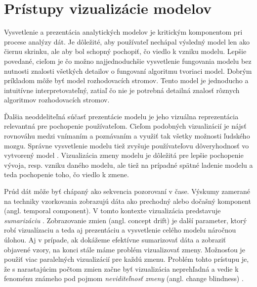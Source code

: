 \chapter{Prístupy vizualizácie modelov}
Vysvetlenie a prezentácia analytických modelov je kritickým komponentom pri procese analýzy dát. Je dôležité, aby používateľ nechápal výsledný model len ako čiernu skrinku, ale aby bol schopný pochopiť, čo viedlo k vzniku modelu. Lepšie povedané, cieľom je čo možno najjednoduchšie vysvetlenie fungovania modelu bez nutnosti znalosti všetkých detailov o fungovaní algoritmu tvoriaci model. Dobrým príkladom môže byť model rozhodovacích stromov. Tento model je jednoducho a intuitívne interpretovateľný, zatiaľ čo nie je potrebná detailná znalosť rôznych algoritmov rozhodovacích stromov.
\par
Ďalšia neoddeliteľná súčasť prezentácie modelu je jeho vizuálna reprezentácia relevantná pre pochopenie používateľom. Cieľom podobných vizualizácií je nájsť rovnováhu medzi vnímaním a poznávaním a využiť tak všetky možnosti ľudského mozgu. Správne vysvetlenie modelu tiež zvyšuje používateľovu dôveryhodnosť vo vytvorený model \citep{Demsar2014, Barlow2001}. Vizualizácia zmeny modelu je dôležitá pre lepšie pochopenie vývoja, resp. vzniku daného modelu, ale tiež na prípadné spätné ladenie modelu a teda pochopenie toho, čo viedlo k zmene.
\par
Prúd dát môže byť chápaný ako sekvencia pozorovaní v čase. Výskumy zamerané na techniky vzorkovania zobrazujú dáta ako prechodný alebo dočašný komponent (angl. temporal component). V tomto kontexte vizualizácia predstavuje \textit{sumarizáciu} \citep{Demsar2014}. Zobrazovanie zmien (angl. concept drift) je další parameter, ktorý robí vizualízaciu a teda aj prezentáciu a vysvetlenie celého modelu náročnou úlohou. Aj v prípade, ak dokážeme efektívne sumarizovať dáta a zobraziť objavené vzory, na konci stále máme problém vizualizovať zmeny. Možnosťou je použiť viac paralelných vizualizácií pre každú zmenu. Problém tohto prístupu je, že s narastajúcim počtom zmien začne byť vizualizácia neprehľadná a vedie k fenoménu známeho pod pojmom \textit{neviditeľnosť zmeny} (angl. change blindness) \citep{Demsar2014}.
\par
